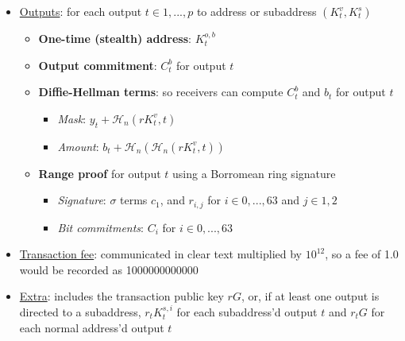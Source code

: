 \begin{itemize}
    \item \underline{Outputs}: for each output $t \in 1,...,p$ to address or subaddress $(K^v_t,K^s_t)$
    \begin{itemize}
        \item \textbf{One-time (stealth) address}: $K^{o,b}_t$
        \item \textbf{Output commitment}: $C^{b}_t$ for output $t$
        \item \textbf{Diffie-Hellman terms}: so receivers can compute $C^{b}_t$ and $b_t$ for output $t$
        \begin{itemize}
            \item \textit{Mask}: $y_t + \mathcal{H}_n(r K^v_t,t)$
            \item \textit{Amount}: $b_t + \mathcal{H}_n(\mathcal{H}_n(r K^v_t,t))$
        \end{itemize}
        \item \textbf{Range proof} for output $t$ using a Borromean ring signature
        \begin{itemize}
            \item \textit{Signature}: $\sigma$ terms $c_1$, and $r_{i,j}$ for $i \in 0,...,63$ and $j \in 1,2$
            \item \textit{Bit commitments}: $C_i$ for $i \in 0,...,63$
        \end{itemize}
    \end{itemize}
    \item \underline{Transaction fee}: communicated in clear text multiplied by $10^{12}$, so a fee of 1.0 would be recorded as 1000000000000
    \item \underline{Extra}: includes the transaction public key $r G$, or, if at least one output is directed to a subaddress, $r_t K^{s,i}_t$ for each subaddress'd output $t$ and $r_t G$ for each normal address'd output $t$%
\end{itemize}